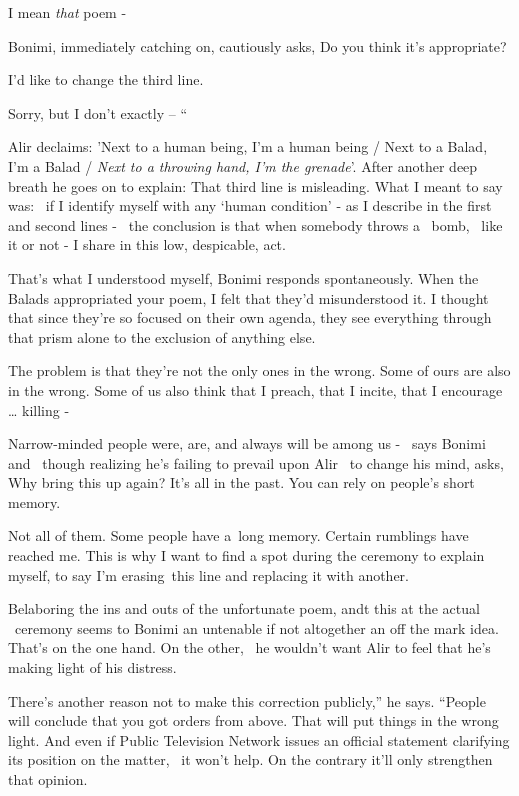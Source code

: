 \documentclass[12pt]{book}
\begin{document}
{\textquotedbl}I mean \textit{that} poem -{\textquotedbl}

Bonimi, immediately catching on, cautiously asks, {\textquotedbl}Do you think it's appropriate?{\textquotedbl}

{\textquotedbl}I'd like to change the third line.{\textquotedbl}

{\textquotedbl}Sorry, but I don't exactly -- ``

Alir declaims: {\textquotedbl}'Next to a human being, I'm a human being / Next to a Balad, I'm a Balad / \textit{Next to
a throwing hand, I'm the grenade}{}'.{\textquotedbl} After another deep breath he goes on to explain:
{\textquotedbl}That third line is misleading. What I meant to say was:~ if I identify myself with any `human condition'
- as I describe in the first and second lines -~ the conclusion is that when somebody throws a~ bomb,~ like it or not -
I share in this low, despicable, act. {\textquotedbl}

{\textquotedbl}That's what I understood myself,{\textquotedbl} Bonimi responds spontaneously. {\textquotedbl}When the
Balads appropriated your poem, I felt that they'd misunderstood it. I thought that since they're so focused on their
own agenda, they see everything through that prism alone to the exclusion of anything else.{\textquotedbl}

{\textquotedbl}The problem is that they're not the only ones in the wrong. Some of ours are also in the wrong. Some of
us also think that I preach, that I incite, that I encourage {\dots} killing -{\textquotedbl}

{\textquotedbl}Narrow-minded people were, are, and always will be among us - {\textquotedbl} \ says Bonimi and \ though
realizing he's failing to prevail upon Alir \ to change his mind, asks, {\textquotedbl}Why bring this up again? It's
all in the past. You can rely on people's short memory.{\textquotedbl}

{\textquotedbl}Not all of them. Some people have a~long memory. Certain rumblings have reached me. This is why I want to
find a spot during the ceremony to explain myself, to say I'm erasing~this line and replacing it with
another.{\textquotedbl}

Belaboring the ins and outs of the unfortunate poem, andt this at the actual \ ceremony seems to Bonimi an untenable if
not altogether an off the mark idea. That's on the one hand. On the other, \ he wouldn't want Alir to feel that he's
making light of his distress.

{\textquotedbl}There's another reason not to make this correction publicly,'' he says. ``People will conclude that you
got orders from above. That will put things in the wrong light. And even if Public Television Network issues an
official statement clarifying its position on the matter, \ it won't help. On the contrary it'll only strengthen that
opinion.{\textquotedbl}
\end{document}
